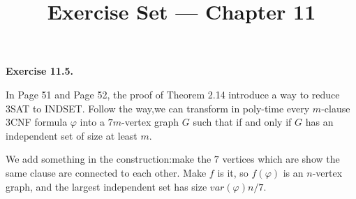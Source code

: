 \documentclass[a4paper]{article}
\title{Exercise Set --- Chapter 11}
\date{}
\newenvironment{exercise}[1]{
	\par
	\noindent\textbf{Exercise #1.}\quad
}{
	\par
	\bigskip
}
\begin{document}
    \maketitle

    \begin{exercise}{11.5}
    	In Page 51 and Page 52, the proof of Theorem 2.14 introduce a way to reduce 3SAT to INDSET. Follow the way,we can transform in poly-time every $m$-clause 3CNF formula $\varphi$ into a $7m$-vertex graph $G$ such that if and only if $G$ has an independent set of size at least $m$.
 
		We add something in the construction:make the $7$ vertices which are show the same clause are connected to each other. Make $f$ is it, so $f(\varphi)$ is an $n$-vertex graph, and the largest independent set has size $var(\varphi)n/7$.
    \end{exercise}
\end{document}
